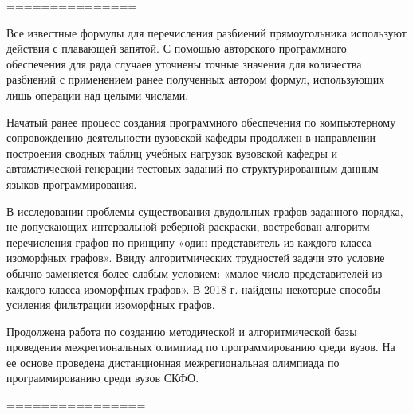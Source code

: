 
===============

Все известные формулы для перечисления разбиений прямоугольника используют действия с плавающей запятой. С помощью авторского программного обеспечения для ряда случаев уточнены точные значения для количества разбиений с применением ранее полученных автором формул, использующих лишь операции над целыми числами.
\par\smallskip
Начатый ранее процесс создания программного обеспечения по компьютерному сопровождению деятельности вузовской кафедры продолжен в направлении построения сводных таблиц учебных нагрузок вузовской кафедры и автоматической генерации тестовых заданий по структурированным данным языков программирования.
\par\smallskip
В исследовании проблемы существования двудольных графов заданного порядка, не допускающих интервальной реберной раскраски, востребован алгоритм перечисления графов по принципу «один представитель из каждого класса изоморфных графов». Ввиду алгоритмических трудностей задачи это условие обычно заменяется более слабым условием: «малое число представителей из каждого класса изоморфных графов». В 2018 г. найдены некоторые способы усиления фильтрации изоморфных графов.
\par\smallskip
Продолжена работа по созданию методической и алгоритмической базы проведения межрегиональных олимпиад по программированию среди вузов. На ее основе проведена дистанционная межрегиональная олимпиада по программированию среди вузов СКФО.


================























%
%
%
%


